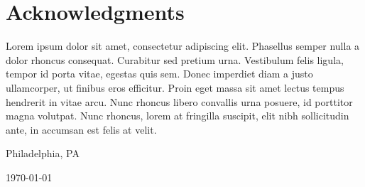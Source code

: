 \chapter*{Acknowledgments}

Lorem ipsum dolor sit amet, consectetur adipiscing elit. Phasellus semper nulla a dolor rhoncus consequat. Curabitur sed pretium urna. Vestibulum felis ligula, tempor id porta vitae, egestas quis sem. Donec imperdiet diam a justo ullamcorper, ut finibus eros efficitur. Proin eget massa sit amet lectus tempus hendrerit in vitae arcu. Nunc rhoncus libero convallis urna posuere, id porttitor magna volutpat. Nunc rhoncus, lorem at fringilla suscipit, elit nibh sollicitudin ante, in accumsan est felis at velit.

\hfill \theauthor

\hfill Philadelphia, PA

\hfill \today
